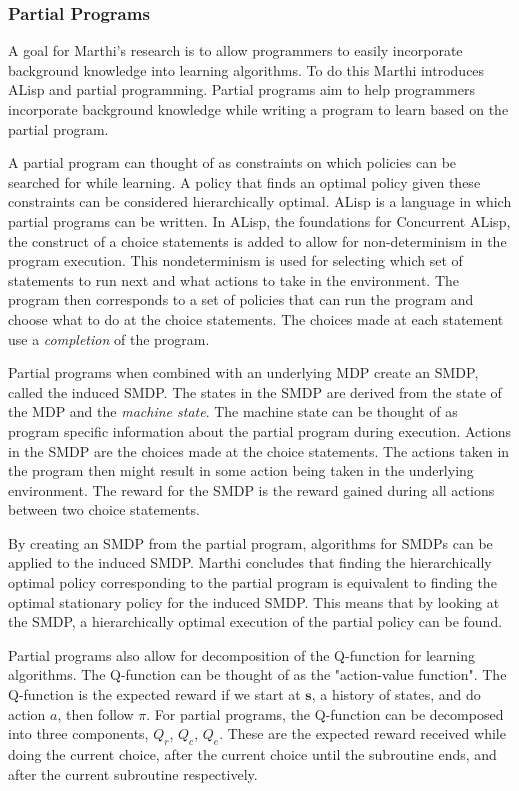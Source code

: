 \documentclass[jair,twoside,11pt,theapa]{article}
\begin{document}
\subsubsection{Partial Programs}
A goal for Marthi's research is to allow programmers to easily incorporate background knowledge into learning algorithms. To do this Marthi introduces ALisp \cite{Andre:2002} and partial programming. Partial programs aim to help programmers incorporate background knowledge while writing a program to learn based on the partial program. 

A partial program can thought of as constraints on which policies can be searched for while learning. A policy that finds an optimal policy given these constraints can be considered hierarchically optimal. ALisp is a language in which partial programs can be written. In ALisp, the foundations for Concurrent ALisp, the construct of a choice statements is added to allow for non-determinism in the program execution. This nondeterminism is used for selecting which set of statements to run next and what actions to take in the environment. The program then corresponds to a set of policies that can run the program and choose what to do at the choice statements. The choices made at each statement use a \textit{completion} of the program. 

Partial programs when combined with an underlying MDP create an SMDP, called the induced SMDP. The states in the SMDP are derived from the state of the MDP and the \textit{machine state}. The machine state can be thought of as program specific information about the partial program during execution. Actions in the SMDP are the choices made at the choice statements. The actions taken in the program then might result in some action being taken in the underlying environment. The reward for the SMDP is the reward gained during all actions between two choice statements. 

By creating an SMDP from the partial program, algorithms for SMDPs can be applied to the induced SMDP. Marthi concludes that finding the hierarchically optimal policy corresponding to the partial program is equivalent to finding the optimal stationary policy for the induced SMDP. This means that by looking at the SMDP, a hierarchically optimal execution of the partial policy can be found.  

Partial programs also allow for decomposition of the Q-function for learning algorithms. The Q-function can be thought of as the "action-value function". The Q-function is the expected reward if we start at $\textbf{s}$, a history of states, and do action $a$, then follow $\pi$. For partial programs, the Q-function can be decomposed into three components, $Q_r$, $Q_c$, $Q_e$. These are the expected reward received while doing the current choice, after the current choice until the subroutine ends, and after the current subroutine respectively.  
\end{document}
